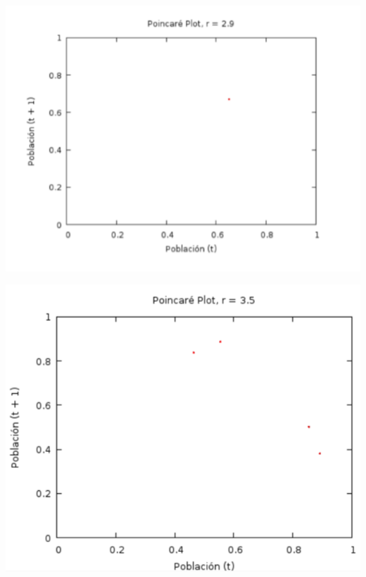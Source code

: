 \documentclass{article}
\begin{document}
\begin{center}
\includegraphics[scale=0.8]{Act106.PNG}
\end{center}
\begin{center}
\includegraphics[scale=0.6]{Act107.PNG}
\end{center}
\end{document}
